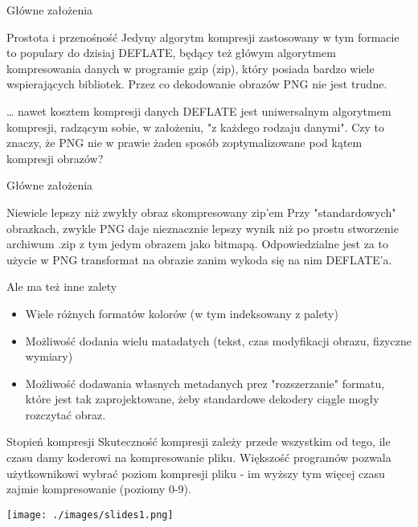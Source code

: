 \documentclass[presentation]{beamer}
\begin{document}
\begin{frame}[label={sec:org6e9e8a6}]{Główne założenia}
\begin{block}{Prostota i przenośność}
Jedyny algorytm kompresji zastosowany w tym formacie to populary
do dzisiaj DEFLATE, będący też główym algorytmem kompresowania
danych w programie gzip (zip), który posiada bardzo wiele
wspierających bibliotek. Przez co dekodowanie obrazów PNG nie jest
trudne.
\end{block}

\begin{block}{\ldots{} nawet kosztem kompresji danych}
DEFLATE jest uniwersalnym algorytmem kompresji, radzącym sobie, w
założeniu, "z każdego rodzaju danymi". Czy to znaczy, że PNG nie w
prawie żaden sposób zoptymalizowane pod kątem kompresji obrazów?
\end{block}
\end{frame}

\begin{frame}[label={sec:orga4b4254}]{Główne założenia}
\begin{block}{Niewiele lepszy niż zwykły obraz skompresowany zip'em}
Przy "standardowych" obrazkach, zwykle PNG daje nieznacznie lepszy
wynik niż po prostu stworzenie archiwum .zip z tym jedym obrazem
jako bitmapą. Odpowiedzialne jest za to użycie w PNG transformat
na obrazie zanim wykoda się na nim DEFLATE'a.
\end{block}

\begin{block}{Ale ma też inne zalety}
\begin{itemize}
\item Wiele różnych formatów kolorów (w tym indeksowany z palety)
\item Możliwość dodania wielu matadatych (tekst, czas modyfikacji obrazu, fizyczne wymiary)
\item Możliwość dodawania własnych metadanych prez "rozszerzanie"
formatu, które jest tak zaprojektowane, żeby standardowe
dekodery ciągle mogły rozczytać obraz.
\end{itemize}
\end{block}
\end{frame}

\begin{frame}[label={sec:orga3b3155}]{Stopień kompresji}
 Skuteczność kompresji zależy przede wszystkim od tego, ile czasu
 damy koderowi na kompresowanie pliku. Większość programów pozwala
 użytkownikowi wybrać poziom kompresji pliku - im wyższy tym więcej
 czasu zajmie kompresowanie
(poziomy 0-9).
\begin{center}
\texttt{[image: ./images/slides1.png]}
\end{center}
\end{frame}
\end{document}
